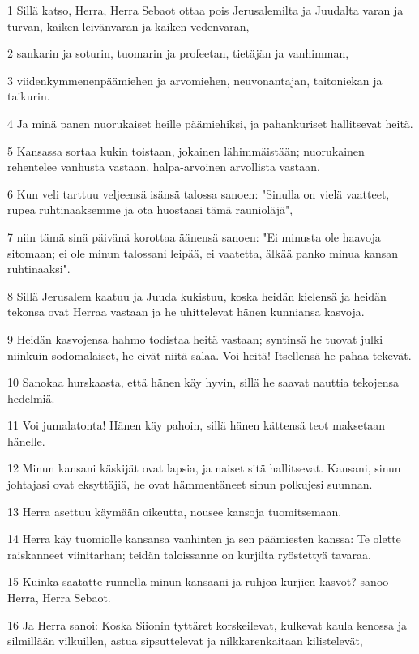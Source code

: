 \par 1 Sillä katso, Herra, Herra Sebaot ottaa pois Jerusalemilta ja Juudalta varan ja turvan, kaiken leivänvaran ja kaiken vedenvaran,
\par 2 sankarin ja soturin, tuomarin ja profeetan, tietäjän ja vanhimman,
\par 3 viidenkymmenenpäämiehen ja arvomiehen, neuvonantajan, taitoniekan ja taikurin.
\par 4 Ja minä panen nuorukaiset heille päämiehiksi, ja pahankuriset hallitsevat heitä.
\par 5 Kansassa sortaa kukin toistaan, jokainen lähimmäistään; nuorukainen rehentelee vanhusta vastaan, halpa-arvoinen arvollista vastaan.
\par 6 Kun veli tarttuu veljeensä isänsä talossa sanoen: "Sinulla on vielä vaatteet, rupea ruhtinaaksemme ja ota huostaasi tämä raunioläjä",
\par 7 niin tämä sinä päivänä korottaa äänensä sanoen: "Ei minusta ole haavoja sitomaan; ei ole minun talossani leipää, ei vaatetta, älkää panko minua kansan ruhtinaaksi".
\par 8 Sillä Jerusalem kaatuu ja Juuda kukistuu, koska heidän kielensä ja heidän tekonsa ovat Herraa vastaan ja he uhittelevat hänen kunniansa kasvoja.
\par 9 Heidän kasvojensa hahmo todistaa heitä vastaan; syntinsä he tuovat julki niinkuin sodomalaiset, he eivät niitä salaa. Voi heitä! Itsellensä he pahaa tekevät.
\par 10 Sanokaa hurskaasta, että hänen käy hyvin, sillä he saavat nauttia tekojensa hedelmiä.
\par 11 Voi jumalatonta! Hänen käy pahoin, sillä hänen kättensä teot maksetaan hänelle.
\par 12 Minun kansani käskijät ovat lapsia, ja naiset sitä hallitsevat. Kansani, sinun johtajasi ovat eksyttäjiä, he ovat hämmentäneet sinun polkujesi suunnan.
\par 13 Herra asettuu käymään oikeutta, nousee kansoja tuomitsemaan.
\par 14 Herra käy tuomiolle kansansa vanhinten ja sen päämiesten kanssa: Te olette raiskanneet viinitarhan; teidän taloissanne on kurjilta ryöstettyä tavaraa.
\par 15 Kuinka saatatte runnella minun kansaani ja ruhjoa kurjien kasvot? sanoo Herra, Herra Sebaot.
\par 16 Ja Herra sanoi: Koska Siionin tyttäret korskeilevat, kulkevat kaula kenossa ja silmillään vilkuillen, astua sipsuttelevat ja nilkkarenkaitaan kilistelevät,
